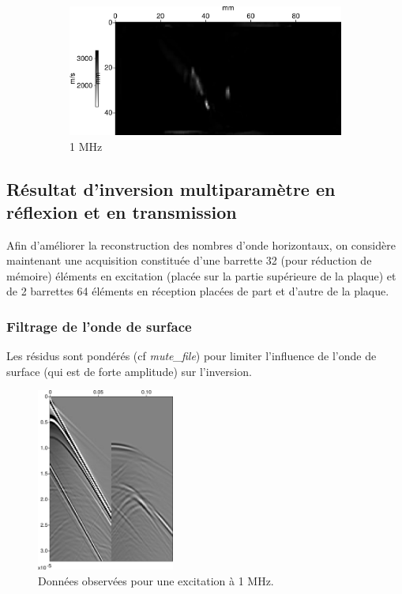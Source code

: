\documentclass[a4paper,11pt]{report} %
\newenvironment{changemargin}[2]{\begin{list}{}{%
\setlength{\topsep}{0pt}%
\setlength{\leftmargin}{0pt}%
\setlength{\rightmargin}{0pt}%
\setlength{\listparindent}{\parindent}%
\setlength{\itemindent}{\parindent}%
\setlength{\parsep}{0pt plus 1pt}%
\addtolength{\leftmargin}{#1}%
\addtolength{\rightmargin}{#2}%
\setlength{\textwidth}{21cm}
}\item }{\end{list}}
\begin{document}
\begin{figure}[!h]
\begin{changemargin}{-2cm}{-2cm}
\begin{subfigure}[b]{0.23\textwidth}
			\includegraphics[width=\textwidth]{img/multi_trans/vs_multi_1M.png}
			\caption{1 MHz}
		\end{subfigure}
	\end{changemargin}
	\caption{\label{res:multi_trans}}
\end{figure}

\subsection{Résultat d'inversion multiparamètre en réflexion et en transmission}

Afin d'améliorer la reconstruction des nombres d'onde horizontaux, on considère maintenant une acquisition constituée d'une barrette 32 (pour réduction de mémoire) éléments en excitation (placée sur la partie supérieure de la plaque) et de 2 barrettes 64 éléments en réception placées de part et d'autre de la plaque.\\

\subsubsection{Filtrage de l'onde de surface}
Les résidus sont pondérés (cf \emph{mute\_file}) pour limiter l'influence de l'onde de surface (qui est de forte amplitude) sur l'inversion.

\begin{figure}
	\centering
	\includegraphics[height=6cm]{img/multi_ref_trans/data.png}
	\caption{Données observées pour une excitation à 1 MHz.}
\end{figure}





\end{document}
